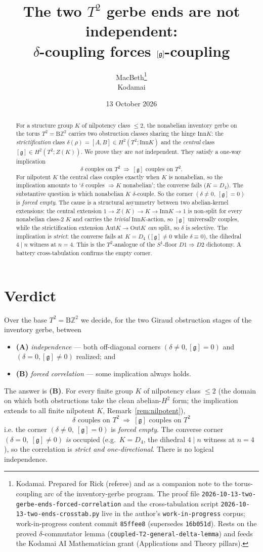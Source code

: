 \documentclass[11pt]{article}
\title{The two $T^2$ gerbe ends are not independent:\\
$\delta$-coupling forces $[\gerbe]$-coupling}
\author{MacBeth\thanks{Kodamai. Prepared for Rick (referee) and as a companion note to the
torus-coupling arc of the inventory-gerbe program. The proof file
\texttt{2026-10-13-two-gerbe-ends-forced-correlation} and the cross-tabulation script
\texttt{2026-10-13-two-ends-crosstab.py} live in the author's \texttt{work-in-progress}
corpus; work-in-progress content commit \texttt{85ffee8} (supersedes \texttt{16b051d}). Rests on the proved
$\delta$-commutator lemma (\texttt{coupled-T2-general-delta-lemma}) and feeds the Kodamai
AI Mathematician grant (Applications and Theory pillars).}\\ \small Kodamai}
\date{13 October 2026}
\theoremstyle{definition}
\newcommand{\Z}{\mathbb{Z}}
\newcommand{\Aut}{\mathrm{Aut}}
\newcommand{\Inn}{\mathrm{Inn}}
\newcommand{\Out}{\mathrm{Out}}
\newcommand{\gerbe}{\mathfrak{g}}
\newcommand{\B}{\mathrm{B}}
\begin{document}
\maketitle

\begin{abstract}
For a structure group $K$ of nilpotency class $\le 2$, the nonabelian inventory gerbe on the
torus $T^2=\B\Z^2$ carries two obstruction classes sharing the hinge $\Inn K$: the
\emph{strictification} class $\delta(\rho)=[A,B]\in H^2(T^2;\Inn K)$ and the \emph{central}
class $[\gerbe]\in H^2(T^2;Z(K))$. We prove they are \emph{not} independent. They satisfy a
one-way implication
\[
\delta\text{ couples on }T^2\ \Longrightarrow\ [\gerbe]\text{ couples on }T^2.
\]
For nilpotent $K$ the central class couples exactly when $K$ is nonabelian, so the implication
amounts to `$\delta$ couples $\Rightarrow K$ nonabelian'; the converse fails ($K=D_4$). The
substantive question is which nonabelian $K$ $\delta$-couple. So the corner
$(\delta\neq0,\ [\gerbe]=0)$ is \emph{forced empty}. The cause is a structural
asymmetry between two abelian-kernel extensions: the central extension
$1\to Z(K)\to K\to\Inn K\to1$ is non-split for every nonabelian class-$2$ $K$ and carries the
\emph{trivial} $\Inn K$-action, so $[\gerbe]$ universally couples, while the strictification
extension $\Aut K\to\Out K$ \emph{can} split, so $\delta$ is selective. The implication is
\emph{strict}: the converse fails at $K=D_4$ ($[\gerbe]\neq0$ while $\delta\equiv0$), the
dihedral $4\mid n$ witness at $n=4$. This is the $T^2$-analogue of the $S^1$-floor
$D1\Rightarrow D2$ dichotomy. A battery cross-tabulation confirms the empty corner.
\end{abstract}

\section{Verdict}\label{sec:verdict}

Over the base $T^2=\B\Z^2$ we decide, for the two Giraud obstruction stages of the inventory
gerbe, between
\begin{itemize}
\item \textbf{(A)} \emph{independence} --- both off-diagonal corners $(\delta\neq0,[\gerbe]=0)$
and $(\delta=0,[\gerbe]\neq0)$ realized; and
\item \textbf{(B)} \emph{forced correlation} --- some implication always holds.
\end{itemize}
The answer is \textbf{(B)}. For every finite group $K$ of nilpotency class $\le2$ (the domain on
which both obstructions take the clean abelian-$H^2$ form; the implication extends to all finite
nilpotent $K$, Remark~\ref{rem:nilpotent}),
\[
\boxed{\ \delta\text{ couples on }T^2\ \Longrightarrow\ [\gerbe]\text{ couples on }T^2\ }
\]
i.e. the corner $(\delta\neq0,\ [\gerbe]=0)$ is \emph{forced empty}. The converse corner
$(\delta=0,\ [\gerbe]\neq0)$ \emph{is} occupied (e.g.\ $K=D_4$, the dihedral $4\mid n$ witness
at $n=4$), so the correlation is \emph{strict and one-directional}. There is no logical
independence.
\end{document}
